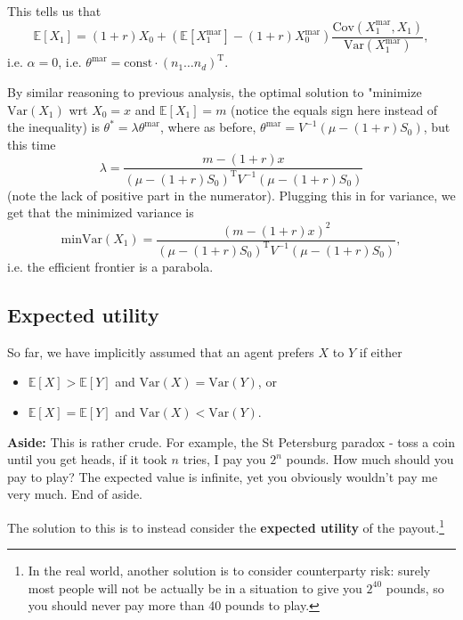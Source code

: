 \documentclass{article}
\theoremstyle{definition}
\begin{document}
\newpage


This tells us that \[
\mathbb{E}[X_1] = (1+r)X_0 + \left(\mathbb{E}[X_1^{\text{mar}}]-(1+r)X_0^{\text{mar}} \right) \frac{\text{Cov}(X_1^{\text{mar}},X_1)}{\text{Var}(X_1^{\text{mar}})},
\]
i.e. $\alpha = 0$, i.e. $\theta^{\text{mar}}= \text{const}\cdot (n_1 \ldots n_d)^{\text{T}}$.
\vspace{1mm}

By similar reasoning to previous analysis, the optimal solution to "minimize $\text{Var}(X_1)$ wrt $X_0 =x$ and $\mathbb{E}[X_1] = m$ (notice the equals sign here instead of the inequality) is $\theta^* = \lambda \theta^{\text{mar}}$, where as before, $\theta^\text{mar} = V^{-1}(\mu - (1+r)S_0)$, but this time \[
\lambda = \frac{m-(1+r)x}{(\mu-(1+r)S_0)^{\text{T}}V^{-1}(\mu-(1+r)S_0)}
\]
(note the lack of positive part in the numerator).
Plugging this in for variance, we get that the minimized variance is 
\[
\text{min}\text{Var}(X_1) = \frac{(m-(1+r)x)^2}{(\mu-(1+r)S_0)^{\text{T}}V^{-1}(\mu-(1+r)S_0)},
\]
i.e. the efficient frontier is a parabola.

\subsection{Expected utility}

So far, we have implicitly assumed that an agent prefers $X$ to $Y$ if either 
\begin{itemize}
    \item $\mathbb{E}[X] > \mathbb{E}[Y]$ and $\text{Var}(X)=\text{Var}(Y)$, or
    \item $\mathbb{E}[X]=\mathbb{E}[Y]$ and $\text{Var}(X)<\text{Var}(Y)$.
\end{itemize}

\textbf{Aside:} This is rather crude. For example, the St Petersburg paradox - toss a coin until you get heads, if it took $n$ tries, I pay you $2^n$ pounds. How much should you pay to play? The expected value is infinite, yet you obviously wouldn't pay me very much. End of aside.
\vspace{1mm}

The solution to this is to instead consider the \textbf{expected utility} of the payout.\footnote{In the real world, another solution is to consider counterparty risk: surely most people will not be actually be in a situation to give you $2^{40}$ pounds, so you should never pay more than 40 pounds to play.}
\end{document}
